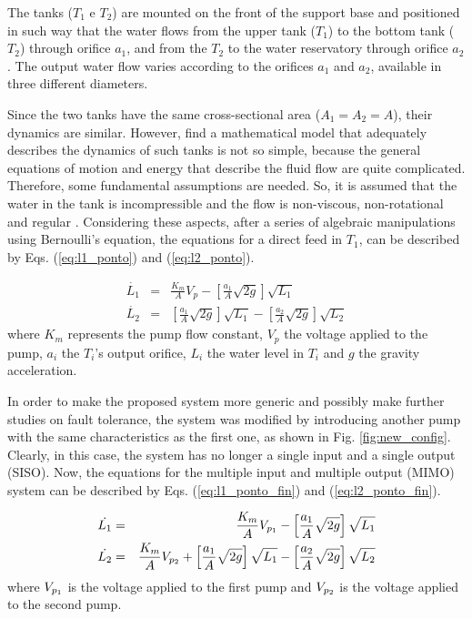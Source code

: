 \documentclass[10pt,fleqn,a4paper]{article}
\begin{document}
The tanks ($T_1$ e $T_2$) are mounted on the front of the support base and
positioned in such way that the water flows from the upper tank ($T_1$) to the
bottom tank ($T_2$) through orifice $a_1$, and from the $T_2$ to the water
reservatory through orifice $a_2$. The output water flow varies according to the
orifices $a_1$ and $a_2$, available in three different diameters.

Since the two tanks have the same cross-sectional area ($A_1 = A_2 = A$), their
dynamics are similar. However, find a mathematical model that adequately
describes the dynamics of such tanks is not so simple, because the general
equations of motion and energy that describe the fluid flow are quite
complicated. Therefore, some fundamental assumptions are needed. So, it is
assumed that the water in the tank is incompressible and the flow is
non-viscous, non-rotational and regular \citep{dorf:2009}. Considering these
aspects, after a series of algebraic manipulations using Bernoulli's equation,
the equations for a direct feed in $T_1$, can be described by Eqs.
(\ref{eq:l1_ponto}) and (\ref{eq:l2_ponto}).

\begin{eqnarray}
\dot{L_1} & = & \frac{K_m}{A}V_p -
                \left[\frac{a_1}{A}\sqrt{2g}\right]\sqrt{L_1}
                \label{eq:l1_ponto}\\
\dot{L_2} & = & \left[\frac{a_1}{A}\sqrt{2g}\right]\sqrt{L_1} -
                \left[\frac{a_2}{A}\sqrt{2g}\right]\sqrt{L_2}
                \label{eq:l2_ponto}
\end{eqnarray}
%
where $K_m$ represents the pump flow constant, $V_p$ the voltage applied to the
pump, $a_i$ the $T_i$'s output orifice, $L_i$ the water level in $T_i$ and $g$
the gravity acceleration.

In order to make the proposed system more generic and possibly make further
studies on fault tolerance, the system was modified by introducing another pump
with the same characteristics as the first one, as shown in Fig.
\ref{fig:new_config}. Clearly, in this case, the system has no longer a single
input and a single output (SISO). Now, the equations for the multiple input and
multiple output (MIMO) system can be described by Eqs. (\ref{eq:l1_ponto_fin})
and (\ref{eq:l2_ponto_fin}).

\begin{eqnarray}
\dot{L_1} & = & \frac{K_m}{A}V_{p_{\tiny 1}} -
                \left[\frac{a_1}{A}\sqrt{2g}\right]\sqrt{L_1}
                \label{eq:l1_ponto_fin}\\
\dot{L_2} & = & \frac{K_m}{A}V_{p_{\tiny 2}} +
                \left[\frac{a_1}{A}\sqrt{2g}\right]\sqrt{L_1} -
                \left[\frac{a_2}{A}\sqrt{2g}\right]\sqrt{L_2}
                \label{eq:l2_ponto_fin}
\end{eqnarray}
%
where $V_{p_{\tiny 1}}$ is the voltage applied to the first pump and
$V_{p_{\tiny 2}}$ is the voltage applied to the second pump.
\end{document}
